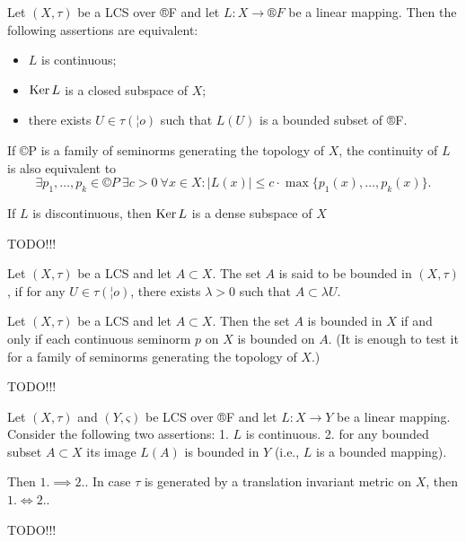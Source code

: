 \documentclass[12pt]{article}					%
\begin{document}
\begin{tvrzeni}
	Let $(X, τ)$ be a LCS over ®F and let $L: X \rightarrow ®F$ be a linear mapping. Then the following assertions are equivalent:
	\begin{itemize}
		\item $L$ is continuous;
		\item $\operatorname{Ker} L$ is a closed subspace of $X$;
		\item there exists $U \in τ(¦o)$ such that $L(U)$ is a bounded subset of ®F.
	\end{itemize}

	If ©P is a family of seminorms generating the topology of $X$, the continuity of $L$ is also equivalent to
	$$ \exists p_1, …, p_k \in ©P\ \exists c > 0\ \forall x \in X: |L(x)| ≤ c·\max\{p_1(x), …, p_k(x)\}. $$

	If $L$ is discontinuous, then $\operatorname{Ker} L$ is a dense subspace of $X$

	\begin{dukazin}
		TODO!!!
	\end{dukazin}
\end{tvrzeni}

\begin{definice}
	Let $(X, τ)$ be a LCS and let $A \subset X$. The set $A$ is said to be bounded in $(X, τ)$, if for any $U \in τ(¦o)$, there exists $λ > 0$ such that $A \subset λ U$.
\end{definice}

\begin{lemma}
	Let $(X, τ)$ be a LCS and let $A \subset X$. Then the set $A$ is bounded in $X$ if and only if each continuous seminorm $p$ on $X$ is bounded on $A$. (It is enough to test it for a family of seminorms generating the topology of $X$.)

	\begin{dukazin}
		TODO!!!
	\end{dukazin}
\end{lemma}

\begin{tvrzeni}
	Let $(X, τ)$ and $(Y, ς)$ be LCS over ®F and let $L: X \rightarrow Y$ be a linear mapping. Consider the following two assertions: 1. $L$ is continuous. 2. for any bounded subset $A \subset X$ its image $L(A)$ is bounded in $Y$ (i.e., $L$ is a bounded mapping).

	Then $1. \implies 2.$. In case $τ$ is generated by a translation invariant metric on $X$, then $1. \Leftrightarrow 2.$.

	\begin{dukazin}
		TODO!!!
	\end{dukazin}
\end{tvrzeni}
\end{document}
